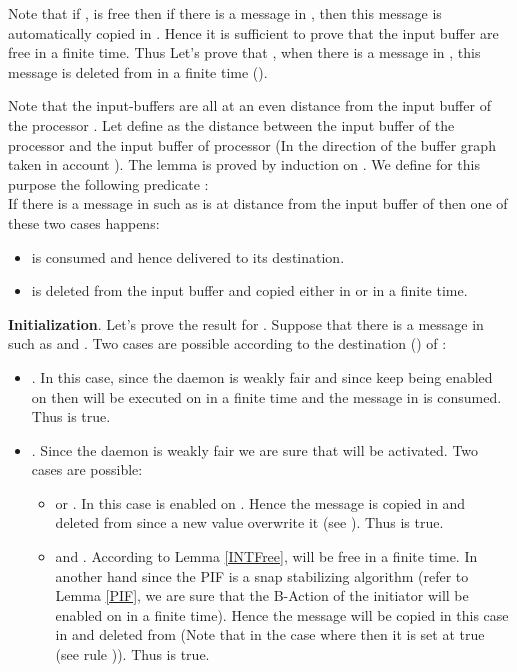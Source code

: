 \documentclass{llncs}
\renewenvironment{proof}{{\it Proof. } }{{\hfill }\vspace{.5pc}}
\begin{document}
\begin{proof}
Note that if ,  is free then if there is a message in , then this message is automatically copied in . Hence it is sufficient to prove that the input buffer are free in a finite time. Thus Let's prove that , when there is a message in , this message is deleted from  in a finite time (). 



Note that the input-buffers are all at an even distance from the input buffer of the processor . Let define  as the distance between the input buffer of the processor  and the input buffer of processor  (In the direction of the buffer graph taken in account ). The lemma is proved by induction on . We define for this purpose the following predicate : \\

If there is a message  in  such as  is at distance  from the input buffer of  then one of these two cases happens:
\begin{itemize}
\item{ is consumed and hence delivered to its destination.}
\item{ is deleted from the input buffer and copied either in  or   in a finite time.}\end{itemize}

\textbf{Initialization}. Let's prove the result for . Suppose that there is a message  in  such as  and . Two cases are possible according to the destination () of :
\begin{itemize}
\item{. In this case, since the daemon is weakly fair and since  keep being enabled on  then  will be executed on  in a finite time and the message  in  is consumed. Thus  is true.}
 \item{}. Since the daemon is weakly fair we are sure that  will be activated. Two cases are possible:
 \begin{itemize}
\item{ or }. In this case  is enabled on . Hence the message  is copied in  and deleted from  since a new value overwrite it (see ). Thus  is true.
\item{ and }. According to Lemma \ref{INTFree},  will be free in a finite time. In another hand since the PIF is a snap stabilizing algorithm (refer to Lemma \ref{PIF}, we are sure that the B-Action of the initiator will be enabled on  in a finite time). Hence the message  will be copied in this case in  and deleted from  (Note that in the case where  then it is set at true (see rule )). Thus  is true.
\end{itemize}
 

\end{itemize}
\end{proof}
\end{document}
